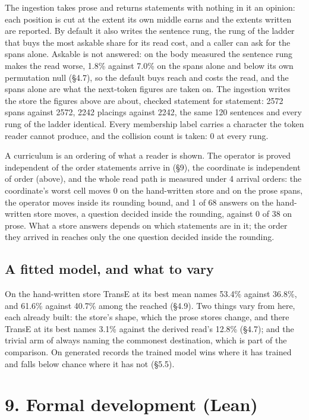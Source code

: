 \documentclass[10pt,letterpaper,twocolumn]{article}
\begin{document}
The ingestion takes prose and returns statements with nothing in it an opinion: each position is cut
at the extent its own middle earns and the extents written are reported. By default it also writes
the sentence rung, the rung of the ladder that buys the most askable share for its read cost, and a
caller can ask for the spans alone. Askable is not answered: on the body measured the sentence rung
makes the read worse, 1.8\% against 7.0\% on the spans alone and below its own permutation null (§4.7),
so the default buys reach and costs the read, and the spans alone are what the next-token figures are
taken on. The ingestion writes the store the figures above are about, checked statement for statement:
2572 spans against 2572, 2242 placings against 2242, the same 120 sentences and every rung of the
ladder identical. Every membership label carries a character the token reader cannot produce, and the
collision count is taken: 0 at every rung.

A curriculum is an ordering of what a reader is shown. The operator is proved independent of the
order statements arrive in (§9), the coordinate is independent of order (above), and the whole read
path is measured under 4 arrival orders: the coordinate's worst cell moves 0 on the hand-written
store and on the prose spans, the operator moves inside its rounding bound, and 1 of 68 answers on
the hand-written store moves, a question decided inside the rounding, against 0 of 38 on prose. What
a store answers depends on which statements are in it; the order they arrived in reaches only the
one question decided inside the rounding.

\subsection{A fitted model, and what to vary}\label{a-fitted-model-and-what-to-vary}

On the hand-written store TransE at its best mean names 53.4\% against 36.8\%, and 61.6\% against 40.7\%
among the reached (§4.9). Two things vary from here, each already built: the store's shape, which the
prose stores change, and there TransE at its best names 3.1\% against the derived read's 12.8\% (§4.7);
and the trivial arm of always naming the commonest destination, which is part of the comparison. On
generated records the trained model wins where it has trained and falls below chance where it has
not (§5.5).

\section{9. Formal development (Lean)}\label{9-formal-development-lean}
\end{document}
